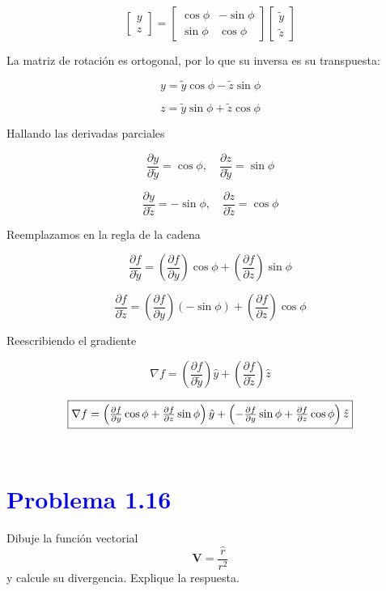 \documentclass[12pt]{article}
\newcommand{\question}[1]{\textcolor{blue}{\textbf{#1}}}
\begin{document}
\[
\begin{bmatrix}
y \\
z
\end{bmatrix}
=
\begin{bmatrix}
\cos\phi & -\sin\phi \\
\sin\phi & \cos\phi
\end{bmatrix}
\begin{bmatrix}
\tilde{y} \\
\tilde{z}
\end{bmatrix}
\]

La matriz de rotación es ortogonal, por lo que su inversa es su transpuesta:

\[
y = \tilde{y} \cos\phi - \tilde{z} \sin\phi
\]

\[
z = \tilde{y} \sin\phi + \tilde{z} \cos\phi
\]

Hallando las derivadas parciales

\[
\frac{\partial y}{\partial \tilde{y}} = \cos\phi, \quad \frac{\partial z}{\partial \tilde{y}} = \sin\phi
\]

\[
\frac{\partial y}{\partial \tilde{z}} = -\sin\phi, \quad \frac{\partial z}{\partial \tilde{z}} = \cos\phi
\]

Reemplazamos en la regla de la cadena

\[
\frac{\partial f}{\partial \tilde{y}} = \left( \frac{\partial f}{\partial y} \right) \cos\phi + \left( \frac{\partial f}{\partial z} \right) \sin\phi
\]

\[
\frac{\partial f}{\partial \tilde{z}} = \left( \frac{\partial f}{\partial y} \right) (-\sin\phi) + \left( \frac{\partial f}{\partial z} \right) \cos\phi
\]

Reescribiendo el gradiente

\[
\nabla f = \left( \frac{\partial f}{\partial \tilde{y}} \right) \hat{y} + \left( \frac{\partial f}{\partial \tilde{z}} \right) \hat{z}
\]

\[ 
\fbox{$\nabla f = \left(\frac{\partial f}{\partial y} \cos\phi + \frac{\partial f}{\partial z} \sin\phi \right) \hat{y} +
\left( -\frac{\partial f}{\partial y} \sin\phi + \frac{\partial f}{\partial z} \cos\phi \right) \hat{z}
$} \]\\


\section*{\question{Problema 1.16}} Dibuje la función vectorial \[
\mathbf{V} = \frac{\hat{r}}{r^2}
\]
y calcule su divergencia. Explique la respuesta.\\
\end{document}
